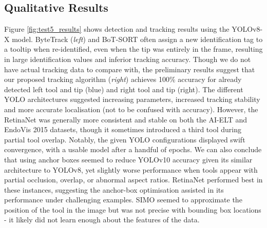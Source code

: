 \normalsize

\subsection{Qualitative Results}

Figure \ref{fig:test5_results} shows detection and tracking results using the YOLOv8-X model. ByteTrack (\textit{left}) and BoT-SORT often assign a new identification tag to a tooltip when re-identified, even when the tip was entirely in the frame, resulting in large identification values and inferior tracking accuracy. Though we do not have actual tracking data to compare with, the preliminary results suggest that our proposed tracking algorithm (\textit{right}) achieves 100\% accuracy for already detected left tool and tip (blue) and right tool and tip (right). The different YOLO architectures suggested increasing parameters, increased tracking stability and more accurate localisation (not to be confused with accuracy). However, the RetinaNet was generally more consistent and stable on both the AI-ELT and EndoVis 2015 datasets, though it sometimes introduced a third tool during partial tool overlap. Notably, the given YOLO configurations displayed swift convergence, with a usable model after a handful of epochs. We can also conclude that using anchor boxes seemed to reduce YOLOv10 accuracy given its similar architecture to YOLOv8, yet slightly worse performance when tools appear with partial occlusion, overlap, or abnormal aspect ratios. RetinaNet performed best in these instances, suggesting the anchor-box optimisation assisted in its performance under challenging examples. SIMO seemed to approximate the position of the tool in the image but was not precise with bounding box locations - it likely did not learn enough about the features of the data.
